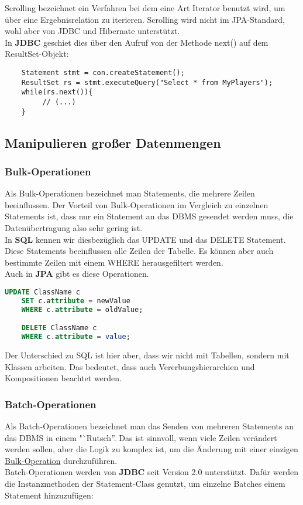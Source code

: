 Scrolling bezeichnet ein Verfahren bei dem eine Art Iterator benutzt wird, um über eine Ergebnisrelation zu iterieren. Scrolling wird nicht im JPA-Standard, wohl aber von JDBC und Hibernate unterstützt.\\
In \textbf{JDBC} geschiet dies über den Aufruf von der Methode next() auf dem ResultSet-Objekt:
\begin{lstlisting}
    Statement stmt = con.createStatement();
    ResultSet rs = stmt.executeQuery("Select * from MyPlayers");
    while(rs.next()){
         // (...)
    }
\end{lstlisting}

\subsection{Manipulieren großer Datenmengen}

\subsubsection{Bulk-Operationen}
\label{sec:bulk-operations}
Als Bulk-Operationen bezeichnet man Statements, die mehrere Zeilen beeinflussen. Der Vorteil von Bulk-Operationen im Vergleich zu einzelnen Statements ist, dass nur ein Statement an das DBMS gesendet werden muss, die Datenübertragung also sehr gering ist.\\
In \textbf{SQL} kennen wir diesbezüglich das UPDATE und das DELETE Statement. Diese Statements beeinflussen alle Zeilen der Tabelle. Es können aber auch bestimmte Zeilen mit einem WHERE herausgefiltert werden.\\
Auch in \textbf{JPA} gibt es diese Operationen.

\begin{lstlisting}[language=SQL]
    UPDATE ClassName c
    SET c.attribute = newValue
    WHERE c.attribute = oldValue;

    DELETE ClassName c
    WHERE c.attribute = value;
\end{lstlisting}

Der Unterschied zu SQL ist hier aber, dass wir nicht mit Tabellen, sondern mit Klassen arbeiten. Das bedeutet, dass auch Vererbungshierarchien und Kompositionen beachtet werden.

\subsubsection{Batch-Operationen}
Als Batch-Operationen bezeichnet man das Senden von mehreren Statements an das DBMS in einem "`Rutsch''. Das ist sinnvoll, wenn viele Zeilen verändert werden sollen, aber die Logik zu komplex ist, um die Änderung mit einer einzigen \hyperref[sec:bulk-operations]{Bulk-Operation} durchzuführen.\\
Batch-Operationen werden von \textbf{JDBC} seit Version 2.0 unterstützt. Dafür werden die Instanzmethoden der Statement-Class genutzt, um einzelne Batches einem Statement hinzuzufügen:

